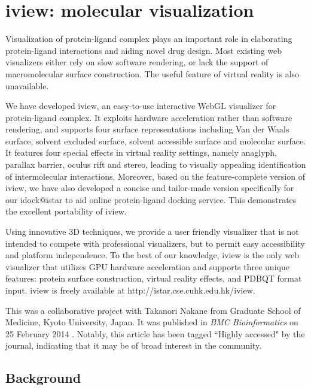 \chapter{iview: molecular visualization}
\label{iview}

Visualization of protein-ligand complex plays an important role in elaborating protein-ligand interactions and aiding novel drug design. Most existing web visualizers either rely on slow software rendering, or lack the support of macromolecular surface construction. The useful feature of virtual reality is also unavailable.

We have developed iview, an easy-to-use interactive WebGL visualizer for protein-ligand complex. It exploits hardware acceleration rather than software rendering, and supports four surface representations including Van der Waals surface, solvent excluded surface, solvent accessible surface and molecular surface. It features four special effects in virtual reality settings, namely anaglyph, parallax barrier, oculus rift and stereo, leading to visually appealing identification of intermolecular interactions. Moreover, based on the feature-complete version of iview, we have also developed a concise and tailor-made version specifically for our idock@istar to aid online protein-ligand docking service. This demonstrates the excellent portability of iview.

Using innovative 3D techniques, we provide a user friendly visualizer that is not intended to compete with professional visualizers, but to permit easy accessibility and platform independence. To the best of our knowledge, iview is the only web visualizer that utilizes GPU hardware acceleration and supports three unique features: protein surface construction, virtual reality effects, and PDBQT format input. iview is freely available at http://istar.cse.cuhk.edu.hk/iview.

This was a collaborative project with Takanori Nakane from Graduate School of Medicine, Kyoto University, Japan. It was published in \textit{BMC Bioinformatics} on 25 February 2014 \citep{1366}. Notably, this article has been tagged ``Highly accessed" by the journal, indicating that it may be of broad interest in the community.

\section{Background}

